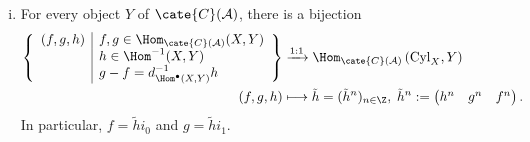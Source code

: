 \begin{proposition}
\begin{enumerate}[(i)]
		\item For every object $Y$ of $\cate{C}(\mathcal{A})$, there is a
		bijection
		\begin{align*}
			\left\{\begin{array}{r|l}
				(f, g, h) & f, g \in \Hom_{\cate{C}(\mathcal{A})}(X, Y) \\
				& h \in \Hom^{-1}(X, Y) \\
				& g - f = d^{-1}_{\Hom^\bullet(X, Y)} h
			\end{array}\right\} & \xrightarrow{1:1} \Hom_{\cate{C}(\mathcal{A})}\left( \mathrm{Cyl}_X, Y \right) \\
			(f, g, h) & \longmapsto \tilde{h} = (\tilde{h}^n)_{n \in \Z}, \; \tilde{h}^n := \begin{pmatrix} h^n & g^n & f^n \end{pmatrix}.
		\end{align*}
		In particular, $f=\tilde{h}i_0$ and $g=\tilde{h}i_1$.
	\end{enumerate}
\end{proposition}
